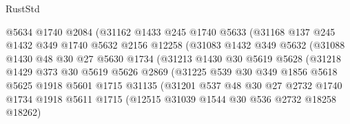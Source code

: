 \begin{lexlean}{RustStd}
\begin{coremodule}
                          @5634
                          @1740
                          @2084
                          (@31162
                            @1433
                            @245
                            @1740
                            @5633
                            (@31168
                              @137
                              @245
                              @1432
                              @349
                              @1740
                              @5632
                              @2156
                              @12258
                              (@31083
                                @1432
                                @349
                                @5632
                                (@31088
                                  @1430
                                  @48
                                  @30
                                  @27
                                  @5630
                                  @1734
                                  (@31213
                                    @1430
                                    @30
                                    @5619
                                    @5628
                                    (@31218
                                      @1429
                                      @373
                                      @30
                                      @5619
                                      @5626
                                      @2869
                                      (@31225
                                        @539
                                        @30
                                        @349
                                        @1856
                                        @5618
                                        @5625
                                        @1918
                                        @5601
                                        @1715
                                        @31135
                                        (@31201
                                          @537
                                          @48
                                          @30
                                          @27
                                          @2732
                                          @1740
                                          @1734
                                          @1918
                                          @5611
                                          @1715
                                          (@12515 @31039 @1544 @30 @536 @2732 @18258 @18262)

\end{coremodule}
\end{lexlean}
